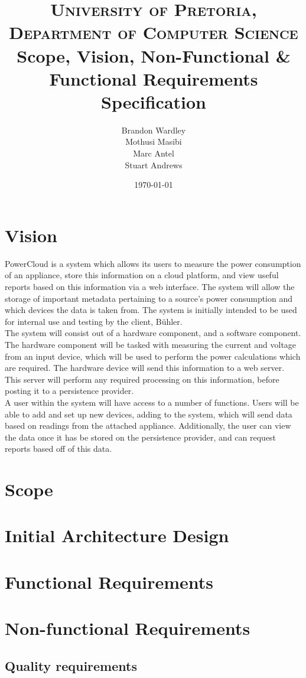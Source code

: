 \documentclass[paper=a4, fontsize=11pt]{scrartcl} %
\title {
	\normalfont \normalsize 
	\textsc{University of Pretoria, Department of Computer Science} \\ [25pt]
	\huge Scope, Vision, Non-Functional \& Functional Requirements Specification\\
}
\author {
	Brandon Wardley  \\
	Mothusi Masibi \\
	Marc Antel \\
	Stuart Andrews \\
}
\date{\normalsize\today} %
\begin{document}
	\maketitle %
	\newpage
	\section{Vision}
	PowerCloud is a system which allows its users to measure the power consumption of an appliance, store this information on a cloud platform, and view useful reports based on this information via a web interface. The system will allow the storage of important metadata pertaining to a source's power consumption and which devices the data is taken from. The system is initially intended to be used for internal use and testing by the client, Bühler.\\
	
	The system will consist out of a hardware component, and a software component. The hardware component will be tasked with measuring the current and voltage from an input device, which will be used to perform the power calculations which are required. The hardware device will send this information to a web server. This server will perform any required processing on this information, before posting it to a persistence provider.\\
	
	A user within the system will have access to a number of functions. Users will be able to add and set up new devices, adding to the system, which will send data based on readings from the attached appliance. Additionally, the user can view the data once it has be stored on the persistence provider, and can request reports based off of this data.
	\newpage
	\section{Scope}
	\newpage
	\section{Initial Architecture Design}
	\newpage
	\section{Functional Requirements}
	\newpage
	\section{Non-functional Requirements}
	\subsection{Quality requirements}
\end{document}
